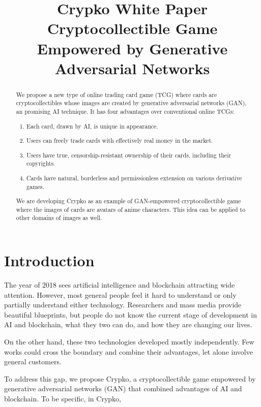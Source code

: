\documentclass[b5paper]{article}
\title{Crypko White Paper \\
  \large Cryptocollectible Game Empowered by Generative Adversarial Networks\\
  \rightline{\small ver 0.9.0 for comike}
}
\author{}
\date{}
\begin{document}
\maketitle
\newpage

\begin{abstract}

We propose a new type of online trading card game (TCG) where cards are cryptocollectibles whose images are created by generative adversarial networks (GAN), an promising AI technique. 
It has four advantages over conventional online TCGs:
\begin{enumerate}
\item Each card, drawn by AI, is unique in appearance.
\item Users can freely trade cards with effectively real money in the market.
\item Users have true, censorship-resistant ownership of their cards, including their copyrights.
\item Cards have natural, borderless and permissionless extension on various derivative games. 
\end{enumerate}

We are developing Crypko as an example of GAN-empowered cryptocollectible game where the images of cards are avatars of anime characters.
This idea can be applied to other domains of images as well.

\end{abstract}

\thispagestyle{empty}

\newpage

\section{Introduction}

The year of 2018 sees artificial intelligence and blockchain attracting wide attention.
However, most general people feel it hard to understand or only partially understand either technology. Researchers and mass media provide beautiful blueprints, but people do not know the current stage of development in AI and blockchain, what they two can do, and how they are changing our lives. 

On the other hand, these two technologies developed mostly independently. Few works could cross the boundary and combine their advantages, let alone involve general customers. 

To address this gap, we propose Crypko, a cryptocollectible game empowered by generative adversarial networks (GAN) that combined advantages of AI and blockchain. To be specific, in Crypko,
\end{document}
